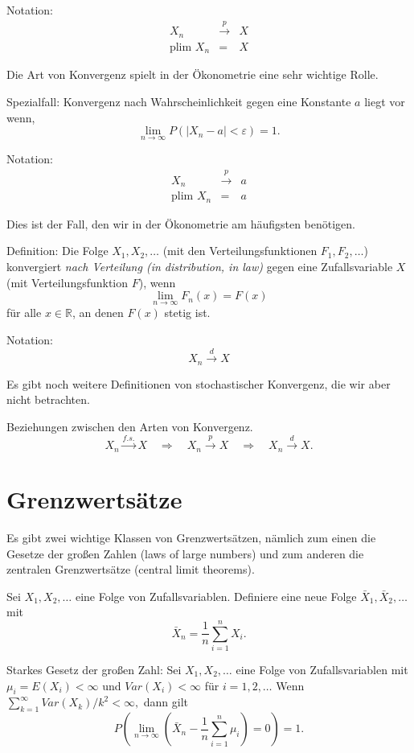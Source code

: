 \documentclass{article}
\begin{document}
Notation:
\begin{eqnarray*}
	X_{n} &\overset{p}{\rightarrow }&X \\
	\textrm{plim }X_{n} &=&X
\end{eqnarray*}

Die Art von Konvergenz spielt in der Ökonometrie eine sehr wichtige Rolle.

Spezialfall: Konvergenz nach Wahrscheinlichkeit gegen eine Konstante $a$ 
liegt vor wenn, 
\[ \lim_{n\rightarrow \infty }P\left( |X_{n}-a|<\varepsilon \right) =1. \]

Notation:
\begin{eqnarray*}
	X_{n} &\overset{p}{\rightarrow }&a \\
	\textrm{plim }X_{n} &=&a
\end{eqnarray*}

Dies ist der Fall, den wir in der Ökonometrie am häufigsten benötigen.

Definition: Die Folge $X_{1},X_{2},\ldots $ (mit den Verteilungsfunktionen
$F_{1},F_{2},\ldots $) konvergiert \emph{nach Verteilung (in distribution, in law)}
gegen eine Zufallsvariable $X$ (mit Verteilungsfunktion $F$), wenn
\[ \lim_{n\rightarrow \infty }F_{n}(x)=F(x) \]
für alle $x\in \mathbb{R}$, an denen $F(x)$ stetig ist.

Notation:
\[ X_{n}\overset{d}{\rightarrow }X \]

Es gibt noch weitere Definitionen von stochastischer Konvergenz, die
wir aber nicht betrachten. 

Beziehungen zwischen den Arten von Konvergenz.
\[ X_{n}\overset{f.s.}{\rightarrow }X\quad 
\Rightarrow \quad X_{n}\overset{p}{\rightarrow }X\quad 
\Rightarrow \quad X_{n}\overset{d}{\rightarrow }X. \]

\section*{Grenzwertsätze}

Es gibt zwei wichtige Klassen von Grenzwertsätzen, nämlich zum einen
die Gesetze der großen Zahlen (laws of large numbers) und zum anderen
die zentralen Grenzwertsätze (central limit theorems).

Sei $X_{1},X_{2},\ldots $ eine Folge von Zufallsvariablen.
Definiere eine neue Folge $\bar{X}_{1},\bar{X}_{2},\ldots $ mit
\[ \bar{X}_{n}=\frac{1}{n}\sum_{i=1}^{n}X_{i}. \]

Starkes Gesetz der großen Zahl:
Sei $X_{1},X_{2},\ldots $ eine Folge von Zufallsvariablen mit
$\mu _{i}=E(X_{i})<\infty $ und $Var(X_{i})<\infty $ für $i=1,2,\ldots $
Wenn $\sum_{k=1}^{\infty }Var(X_{k})/k^{2}<\infty ,$ dann gilt
\[ P\left( \lim_{n\rightarrow \infty }\left( \bar{X}_{n}-\frac{1}{n}%
\sum_{i=1}^{n}\mu _{i}\right) =0\right) =1. \]
\end{document}
